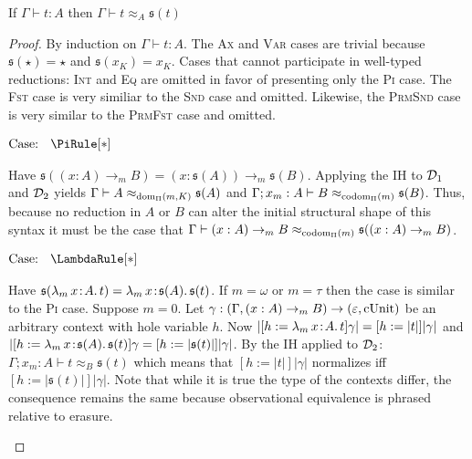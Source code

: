 \begin{theorem}
    \label{lem:5:strict_obs_regular}
    If $\Gamma \vdash t : A$ then $\Gamma \vdash t \approx_A \mathfrak{s}(t)$
\end{theorem}
\begin{proof}
    By induction on $\Gamma \vdash t : A$.
    The \textsc{Ax} and \textsc{Var} cases are trivial because $\mathfrak{s}(\star) = \star$ and $\mathfrak{s}(x_K) = x_K$.
    Cases that cannot participate in well-typed reductions: \textsc{Int} and \textsc{Eq} are omitted in favor of presenting only the \textsc{Pi} case.
    The \textsc{Fst} case is very similiar to the \textsc{Snd} case and omitted.
    Likewise, the \textsc{PrmSnd} case is very similar to the \textsc{PrmFst} case and omitted.

    $\text{Case: }\begin{array}{c} \PiRule[*] \end{array}$
    \begin{proofcase}
        Have $\mathfrak{s}((x : A) \to_m B) = (x : \mathfrak{s}(A)) \to_m \mathfrak{s}(B)$.
        Applying the IH to $\mathcal{D}_{1}$ and $\mathcal{D}_{2}$ yields $\Gamma \vdash A \approx_{\textnormal{dom}_\Pi(m, K)} \mathfrak{s}(A)$ and $\Gamma; x_m : A \vdash B \approx_{\textnormal{codom}_\Pi(m)} \mathfrak{s}(B)$.
        Thus, because no reduction in $A$ or $B$ can alter the initial structural shape of this syntax it must be the case that $\Gamma \vdash (x : A) \to_m B \approx_{\textnormal{codom}_\Pi(m)} \mathfrak{s}((x : A) \to_m B)$.
    \end{proofcase}

    $\text{Case: }\begin{array}{c} \LambdaRule[*] \end{array}$
    \begin{proofcase}
        Have $\mathfrak{s}({\lambda_m}\, x\! : \! A.\, t) = {\lambda_m}\, x\! : \! \mathfrak{s}(A).\, \mathfrak{s}(t)$.
        If $m = \omega$ or $m = \tau$ then the case is similar to the \textsc{Pi} case.
        Suppose $m = 0$.
        Let $\gamma : (\Gamma, (x : A) \to_m B) \to (\varepsilon, \textnormal{cUnit})$ be an arbitrary context with hole variable $h$.
        Now $|[h := {\lambda_m}\, x\! : \! A.\, t]\gamma| = [h := |t|]|\gamma|$ and $|[h := {\lambda_m}\, x\! : \! \mathfrak{s}(A).\, \mathfrak{s}(t)]\gamma = [h := |\mathfrak{s}(t)|]|\gamma|$.
        By the IH applied to $\mathcal{D}_{2}$: $\Gamma; x_m : A \vdash t \approx_B \mathfrak{s}(t)$ which means that $[h := |t|]|\gamma|$ normalizes iff $[h := |\mathfrak{s}(t)|]|\gamma|$.
        Note that while it is true the type of the contexts differ, the consequence remains the same because observational equivalence is phrased relative to erasure.
    \end{proofcase}


\end{proof}

